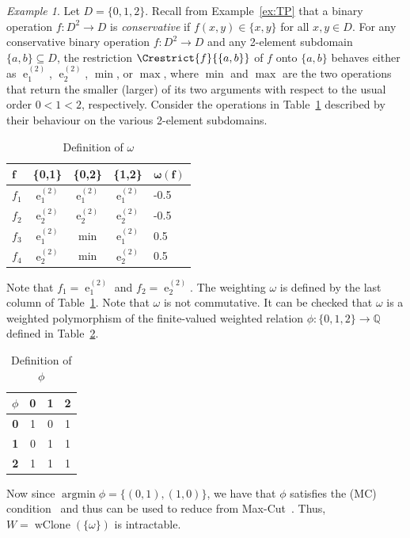 \documentclass[11pt, reqno]{article}
\DeclareMathOperator{\proj}{\ensuremath{e}}
\DeclareMathOperator{\argmin}{argmin}
\DeclareMathOperator{\wclone}{wClone}
\newcommand{\Q}{\mbox{$\mathbb Q$}}
\theoremstyle{remark}
\newtheorem{example}{Example}
\begin{document}
\begin{example}
Let $D=\{0,1,2\}$.
Recall from Example~\ref{ex:TP} that a binary operation $f:D^2\to D$ is \emph{conservative} if $f(x,y)\in\{x,y\}$ for
all $x,y\in D$. 
For any conservative binary operation $f:D^2\to D$ and any 2-element subdomain
$\{a,b\}\subseteq D$, the restriction $\Crestrict{f}{\{a,b\}}$ of $f$ onto $\{a,b\}$
behaves either as $\proj^{(2)}_1$,
$\proj^{(2)}_2$, $\min$, or $\max$, where $\min$ and $\max$ are the two operations
that return the smaller (larger) of its two arguments with respect to the usual order $0<1<2$, respectively.
Consider the operations in Table~\ref{table:w} described by their behaviour on
the various 2-element subdomains.

\begin{table}[htb]
\begin{center}
\begin{tabular}{lccc|l}
$\mathbf{f}$ & \{\textbf{0},\textbf{1}\} & \{\textbf{0},\textbf{2}\} & \{\textbf{1},\textbf{2}\} & $\mathbf{\omega(f)}$\\ \hline
$f_1$ & $\proj^{(2)}_1$ & $\proj^{(2)}_1$ & $\proj^{(2)}_1$ & -0.5 \\
$f_2$ & $\proj^{(2)}_2$ & $\proj^{(2)}_2$ & $\proj^{(2)}_2$ & -0.5 \\
$f_3$ & $\proj^{(2)}_1$ & $\min$ & $\proj^{(2)}_1$ & 0.5 \\
$f_4$ & $\proj^{(2)}_2$ & $\min$ & $\proj^{(2)}_2$ & 0.5 \\
\end{tabular}
\end{center}
\caption{Definition of $\omega$}\label{table:w}
\end{table}

Note that $f_1=\proj^{(2)}_1$ and $f_{2}=\proj^{(2)}_2$.
%
The weighting $\omega$ is defined by the last column of
Table~\ref{table:w}.
Note that $\omega$ is not commutative.
It can be checked that $\omega$ is a weighted polymorphism
of the finite-valued weighted relation $\phi : \{0,1,2\} \to \Q$ defined in Table~\ref{table:phi}.

\begin{table}[hbt]
\begin{center}
\begin{tabular}{c|ccc}
$\phi$ & \textbf{0} & \textbf{1} & \textbf{2} \\ \hline
\textbf{0} & 1 & 0 & 1 \\
\textbf{1} & 0 & 1 & 1 \\
\textbf{2} & 1 & 1 & 1 
\end{tabular}
\end{center}
\caption{Definition of $\phi$}\label{table:phi}
\end{table}

Now since $\argmin \phi=\{(0,1),(1,0)\}$, we have that $\phi$ satisfies the (MC)
condition~\cite{tz13:stoc} and thus can be used to reduce from
Max-Cut~\cite{Cohen06:complexitysoft}. Thus, $W=\wclone(\{\omega\})$ is
intractable.
\end{example}
\end{document}
